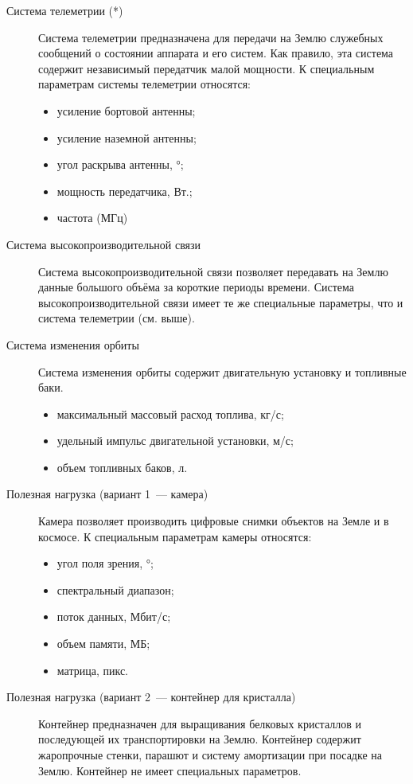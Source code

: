 \documentclass[12pt,a4paper]{article}
\begin{document}
\begin{description}
\item [Система телеметрии (*)] Система телеметрии предназначена для передачи на Землю
  служебных сообщений о состоянии аппарата и его систем. Как правило, эта система содержит
  независимый передатчик малой мощности. К специальным параметрам системы телеметрии
  относятся:
  \begin{itemize}
  \item усиление бортовой антенны;
  \item усиление наземной антенны;
  \item угол раскрыва антенны, °;
  \item мощность передатчика, Вт.;
  \item частота (МГц)
  \end{itemize}
  
\item [Система высокопроизводительной связи] Система высокопроизводительной связи
  позволяет передавать на Землю данные большого объёма за короткие периоды
  времени. Система высокопроизводительной связи имеет те же специальные параметры, что и
  система телеметрии (см. выше).

\item [Система изменения орбиты] Система изменения орбиты содержит двигательную установку
  и топливные баки.
  \begin{itemize}
    \item максимальный массовый расход топлива, кг/с;
    \item удельный импульс двигательной установки, м/с;
    \item объем топливных баков, л.
  \end{itemize}

\item [Полезная нагрузка (вариант 1~--- камера)] Камера позволяет производить цифровые
  снимки объектов на Земле и в космосе. К специальным параметрам камеры относятся:
  \begin{itemize}
  \item угол поля зрения, °;
  \item спектральный диапазон;
  \item поток данных, Мбит/с;
  \item объем памяти, МБ;
  \item матрица, пикс.
  \end{itemize}

\item [Полезная нагрузка (вариант 2~--- контейнер для кристалла)] Контейнер предназначен
  для выращивания белковых кристаллов и последующей их транспортировки на Землю. Контейнер
  содержит жаропрочные стенки, парашют и систему амортизации при посадке на
  Землю. Контейнер не имеет специальных параметров.

\end{description}
\end{document}
